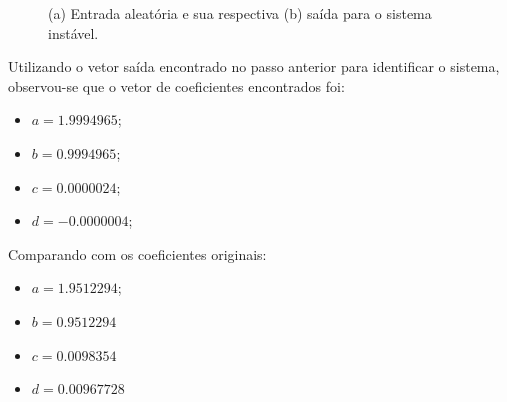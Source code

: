 \begin{figure}[H]
\begin{center}
\end{center}
\caption{(a) Entrada aleatória e sua respectiva (b) saída para o sistema instável.}
\label{id:ins:entsai} 
\end{figure}

Utilizando o vetor saída encontrado no passo anterior para identificar o sistema, observou-se que o vetor de coeficientes encontrados foi:

\begin{itemize}
    \item $a = 1.9994965$;
    \item $b = 0.9994965$;
    \item $c = 0.0000024$;
    \item $d = -0.0000004$;
\end{itemize}

Comparando com os coeficientes originais:

\begin{itemize}
    \item $a = 1.9512294$;
    \item $b = 0.9512294$
    \item $c = 0.0098354$
    \item $d = 0.00967728$
\end{itemize}

